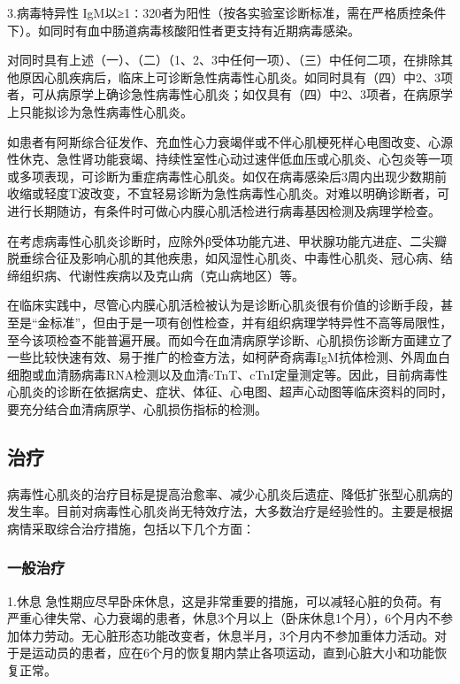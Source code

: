 3.病毒特异性
IgM以≥1∶320者为阳性（按各实验室诊断标准，需在严格质控条件下）。如同时有血中肠道病毒核酸阳性者更支持有近期病毒感染。

对同时具有上述（一）、（二）（1、2、3中任何一项）、（三）中任何二项，在排除其他原因心肌疾病后，临床上可诊断急性病毒性心肌炎。如同时具有（四）中2、3项者，可从病原学上确诊急性病毒性心肌炎；如仅具有（四）中2、3项者，在病原学上只能拟诊为急性病毒性心肌炎。

如患者有阿斯综合征发作、充血性心力衰竭伴或不伴心肌梗死样心电图改变、心源性休克、急性肾功能衰竭、持续性室性心动过速伴低血压或心肌炎、心包炎等一项或多项表现，可诊断为重症病毒性心肌炎。如仅在病毒感染后3周内出现少数期前收缩或轻度T波改变，不宜轻易诊断为急性病毒性心肌炎。对难以明确诊断者，可进行长期随访，有条件时可做心内膜心肌活检进行病毒基因检测及病理学检查。

在考虑病毒性心肌炎诊断时，应除外β受体功能亢进、甲状腺功能亢进症、二尖瓣脱垂综合征及影响心肌的其他疾患，如风湿性心肌炎、中毒性心肌炎、冠心病、结缔组织病、代谢性疾病以及克山病（克山病地区）等。

在临床实践中，尽管心内膜心肌活检被认为是诊断心肌炎很有价值的诊断手段，甚至是“金标准”，但由于是一项有创性检查，并有组织病理学特异性不高等局限性，至今该项检查不能普遍开展。而如今在血清病原学诊断、心肌损伤诊断方面建立了一些比较快速有效、易于推广的检查方法，如柯萨奇病毒IgM抗体检测、外周血白细胞或血清肠病毒RNA检测以及血清cTnT、cTnI定量测定等。因此，目前病毒性心肌炎的诊断在依据病史、症状、体征、心电图、超声心动图等临床资料的同时，要充分结合血清病原学、心肌损伤指标的检测。

\subsection{治疗}

病毒性心肌炎的治疗目标是提高治愈率、减少心肌炎后遗症、降低扩张型心肌病的发生率。目前对病毒性心肌炎尚无特效疗法，大多数治疗是经验性的。主要是根据病情采取综合治疗措施，包括以下几个方面：

\subsubsection{一般治疗}

1.休息
急性期应尽早卧床休息，这是非常重要的措施，可以减轻心脏的负荷。有严重心律失常、心力衰竭的患者，休息3个月以上（卧床休息1个月），6个月内不参加体力劳动。无心脏形态功能改变者，休息半月，3个月内不参加重体力活动。对于是运动员的患者，应在6个月的恢复期内禁止各项运动，直到心脏大小和功能恢复正常。

